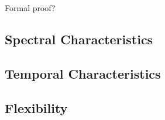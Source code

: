 			\note
			{
				Formal proof?
			}

	\subsection{Spectral Characteristics}
	\label{sec:ExcitationEvaluation-Comparison-SpectralCharacteristics}

	\subsection{Temporal Characteristics}
	\label{sec:ExcitationEvaluation-Comparison-TemporalCharacteristics}

	\subsection{Flexibility}
	\label{sec:ExcitationEvaluation-Comparison-Flexibility}

